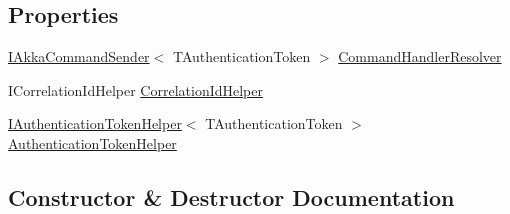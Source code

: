 \subsection*{Properties}
\begin{DoxyCompactItemize}
\item 
\hyperlink{interfaceCqrs_1_1Akka_1_1Commands_1_1IAkkaCommandSender}{I\+Akka\+Command\+Sender}$<$ T\+Authentication\+Token $>$ \hyperlink{classCqrs_1_1Akka_1_1Commands_1_1AkkaCommandBusProxy_1_1BusActor_ae58c856ec0ec0f0cf2eda4d87c56fbf1}{Command\+Handler\+Resolver}
\item 
I\+Correlation\+Id\+Helper \hyperlink{classCqrs_1_1Akka_1_1Commands_1_1AkkaCommandBusProxy_1_1BusActor_ab353a9b434004f9b0637dd5dbe4402ac}{Correlation\+Id\+Helper}
\item 
\hyperlink{interfaceCqrs_1_1Authentication_1_1IAuthenticationTokenHelper}{I\+Authentication\+Token\+Helper}$<$ T\+Authentication\+Token $>$ \hyperlink{classCqrs_1_1Akka_1_1Commands_1_1AkkaCommandBusProxy_1_1BusActor_a10dd32ee768f6ccf93aa0e04472c84b6}{Authentication\+Token\+Helper}
\end{DoxyCompactItemize}


\subsection{Constructor \& Destructor Documentation}
\mbox{\label{classCqrs_1_1Akka_1_1Commands_1_1AkkaCommandBusProxy_1_1BusActor_a3a91b0c5338c8fbd59bd7e5751ba2f32}} 
